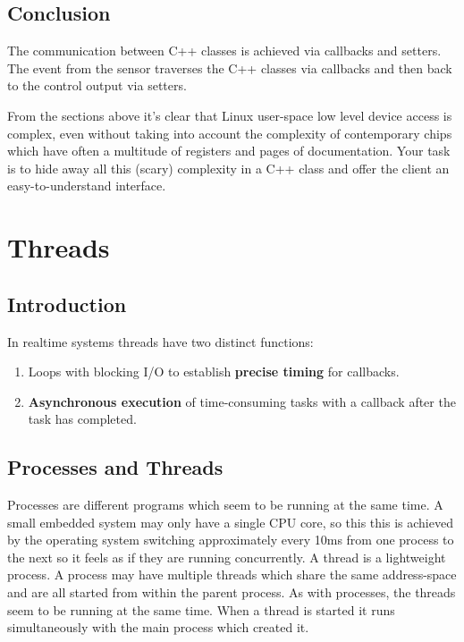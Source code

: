 \documentclass[12pt]{report}
\begin{document}
\section{Conclusion}
The communication between C++ classes is achieved via
callbacks and setters. The event from the sensor traverses
the C++ classes via callbacks and then back to the control
output via setters.

From the sections above it's clear that Linux user-space low level
device access is complex, even without taking into account the
complexity of contemporary chips which have often a multitude of
registers and pages of documentation. Your task is to hide away
all this (scary) complexity in a C++ class and offer the client
an easy-to-understand interface.





\chapter{Threads\label{threads}}

\section{Introduction}
In realtime systems threads have two distinct functions:
\begin{enumerate}
\item Loops with blocking I/O
  to establish \textbf{precise timing} for callbacks.
\item \textbf{Asynchronous execution} of time-consuming tasks
  with a callback after the task has completed.
\end{enumerate}


\section{Processes and Threads}
Processes are different programs which seem to be running at the same
time. A small embedded system may only have a single CPU core,
so this this is achieved by the operating system switching
approximately every 10ms from one process to the next so it feels as
if they are running concurrently. A thread is a lightweight
process. A process may have  multiple threads which share the same
address-space and are all started from
within the parent process. As with processes, the threads seem to be
running at the same time. When a thread is started it runs
simultaneously with the main process which created it.
\end{document}
